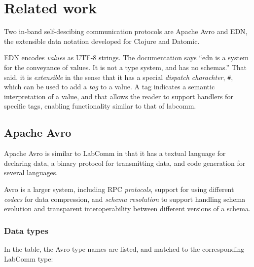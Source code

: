 \documentclass[a4paper]{article}
\begin{document}
\section{Related work}
  
Two in-band self-descibing communication protocols are Apache
Avro\cite{avro} and EDN, the extensible data notation developed for
Clojure and Datomic\cite{EDN}.

EDN encodes \emph{values} as UTF-8 strings. The documentation says
``edn is a system for the conveyance of values. It is not a type system,
and has no schemas.'' That said, it is \emph{extensible} in the sense
that it has a special \emph{dispatch charachter}, \verb+#+, which can  
be used to add a \emph{tag} to a value. A tag indicates a semantic
interpretation of a value, and that allows the reader to support
handlers for specific tags, enabling functionality similar to that of
labcomm.

\subsection{Apache Avro}

Apache Avro is similar to LabComm in that it has a textual language
for declaring data, a binary protocol for transmitting data, and code
generation for several languages.

Avro is a larger system, including RPC \emph{protocols}, support for
using different \emph{codecs} for data compression, and \emph{schema
resolution} to support handling schema evolution and transparent 
interoperability between different versions of a schema.

\subsubsection*{Data types} 

In the table, the Avro type names are listed, and matched to the
corresponding LabComm type:
\end{document}

